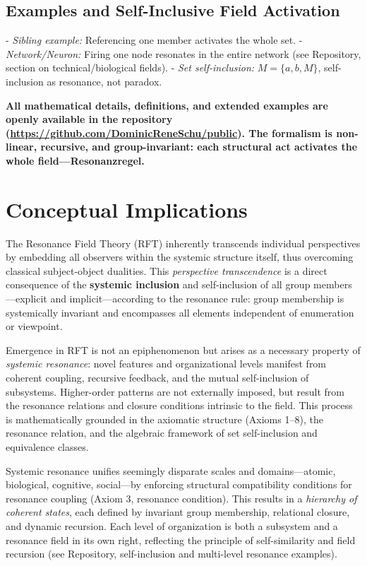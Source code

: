 \documentclass[12pt]{article}
\begin{document}
\subsection{Examples and Self-Inclusive Field Activation}

- \textit{Sibling example:} Referencing one member activates the whole set.
- \textit{Network/Neuron:} Firing one node resonates in the entire network (see Repository, section on technical/biological fields).
- \textit{Set self-inclusion:} $M = \{a, b, M\}$, self-inclusion as resonance, not paradox.

\medskip

\textbf{All mathematical details, definitions, and extended examples are openly available in the repository (\url{https://github.com/DominicReneSchu/public}). The formalism is non-linear, recursive, and group-invariant: each structural act activates the whole field—Resonanzregel.}

	
	\section{Conceptual Implications}
	
	The Resonance Field Theory (RFT) inherently transcends individual perspectives by embedding all observers within the systemic structure itself, thus overcoming classical subject-object dualities. This \textit{perspective transcendence} is a direct consequence of the \textbf{systemic inclusion} and self-inclusion of all group members—explicit and implicit—according to the resonance rule: group membership is systemically invariant and encompasses all elements independent of enumeration or viewpoint.
	
	Emergence in RFT is not an epiphenomenon but arises as a necessary property of \textit{systemic resonance}: novel features and organizational levels manifest from coherent coupling, recursive feedback, and the mutual self-inclusion of subsystems. Higher-order patterns are not externally imposed, but result from the resonance relations and closure conditions intrinsic to the field. This process is mathematically grounded in the axiomatic structure (Axioms 1–8), the resonance relation, and the algebraic framework of set self-inclusion and equivalence classes.
	
	Systemic resonance unifies seemingly disparate scales and domains—atomic, biological, cognitive, social—by enforcing structural compatibility conditions for resonance coupling (Axiom 3, resonance condition). This results in a \textit{hierarchy of coherent states}, each defined by invariant group membership, relational closure, and dynamic recursion. Each level of organization is both a subsystem and a resonance field in its own right, reflecting the principle of self-similarity and field recursion (see Repository, self-inclusion and multi-level resonance examples).
	
\end{document}
